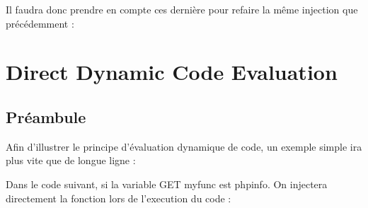 \documentclass{article}
\begin{document}
Il faudra donc prendre en compte ces dernière pour refaire la même injection que précédemment :
\vspace{0.2cm}\\
\vspace{0.2cm}

\newpage
\section{Direct Dynamic Code Evaluation}
\subsection{Préambule}

Afin d'illustrer le principe d'évaluation dynamique de code, un exemple simple ira plus vite que de longue ligne :
\vspace{0.2cm}\\
\vspace{0.2cm}

Dans le code suivant, si la variable GET myfunc est phpinfo. On injectera directement la fonction lors de l'execution du code :
\vspace{0.2cm}\\
\vspace{0.2cm}
\end{document}
